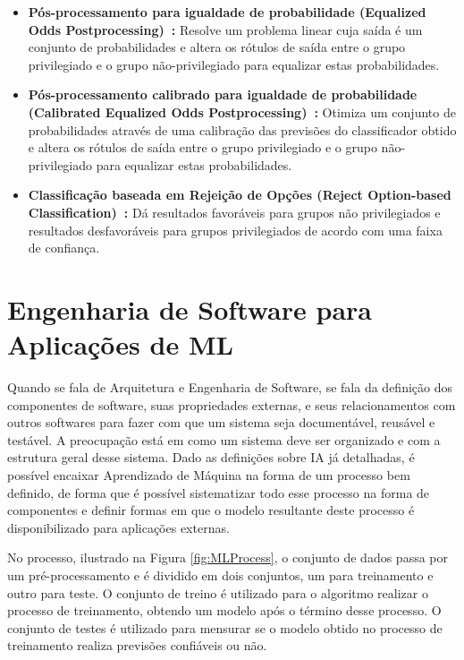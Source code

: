 \documentclass[Portugues,Final]{ic-tese-v3}
\begin{document}
\begin{itemize}
\item \textbf{Pós-processamento para igualdade de probabilidade (Equalized Odds Postprocessing)~\cite{Hardt_2016}:} Resolve um problema linear cuja saída é um conjunto de probabilidades e altera os rótulos de saída entre o grupo privilegiado e o grupo não-privilegiado para equalizar estas probabilidades.

\item \textbf{Pós-processamento calibrado para igualdade de probabilidade (Calibrated Equalized Odds Postprocessing)~\cite{Pleiss_2017}:} Otimiza um conjunto de probabilidades através de uma calibração das previsões do classificador obtido e altera os rótulos de saída entre o grupo privilegiado e o grupo não-privilegiado para equalizar estas probabilidades.

\item \textbf{Classificação baseada em Rejeição de Opções (Reject Option-based Classification)~\cite{Kamiran_2012}:} Dá resultados favoráveis para grupos não privilegiados e resultados desfavoráveis para grupos privilegiados de acordo com uma faixa de confiança.

\end{itemize}

\section{Engenharia de Software para Aplicações de ML}
\label{sec:EngSoftware}

Quando se fala de Arquitetura e Engenharia de Software, se fala da definição dos componentes de software, suas propriedades externas, e seus relacionamentos com outros softwares para fazer com que um sistema seja documentável, reusável e testável. A preocupação está em como um sistema deve ser organizado e com a estrutura geral desse sistema. Dado as definições sobre IA já detalhadas, é possível encaixar Aprendizado de Máquina na forma de um processo bem definido, de forma que é possível sistematizar todo esse processo na forma de componentes e definir formas em que o modelo resultante deste processo é disponibilizado para aplicações externas.

No processo, ilustrado na Figura \ref{fig:MLProcess}, o conjunto de dados passa por um pré-processamento e é dividido em dois conjuntos, um para treinamento e outro para teste. O conjunto de treino é utilizado para o algoritmo realizar o processo de treinamento, obtendo um modelo após o término desse processo. O conjunto de testes é utilizado para mensurar se o modelo obtido no processo de treinamento realiza previsões confiáveis ou não.
\end{document}
